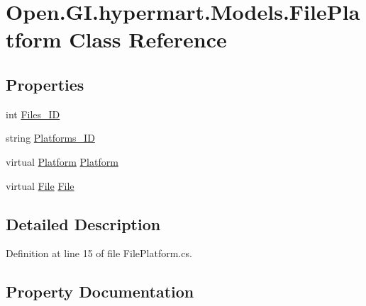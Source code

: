 \hypertarget{class_open_1_1_g_i_1_1hypermart_1_1_models_1_1_file_platform}{}\section{Open.\+G\+I.\+hypermart.\+Models.\+File\+Platform Class Reference}
\label{class_open_1_1_g_i_1_1hypermart_1_1_models_1_1_file_platform}
\subsection*{Properties}
\begin{DoxyCompactItemize}
\item 
int \hyperlink{class_open_1_1_g_i_1_1hypermart_1_1_models_1_1_file_platform_a6a2b6dbace772016d649b3feb7c65e44}{Files\+\_\+\+I\+D}
\item 
string \hyperlink{class_open_1_1_g_i_1_1hypermart_1_1_models_1_1_file_platform_afe9e1d6e156cababf5d2123d21556d5f}{Platforms\+\_\+\+I\+D}
\item 
virtual \hyperlink{class_open_1_1_g_i_1_1hypermart_1_1_models_1_1_platform}{Platform} \hyperlink{class_open_1_1_g_i_1_1hypermart_1_1_models_1_1_file_platform_aeab28cbe72f89ee18f61510d8ea2b7bc}{Platform}
\item 
virtual \hyperlink{class_open_1_1_g_i_1_1hypermart_1_1_models_1_1_file}{File} \hyperlink{class_open_1_1_g_i_1_1hypermart_1_1_models_1_1_file_platform_aa9fd91411ba71f8dd77bdba062daecd3}{File}
\end{DoxyCompactItemize}


\subsection{Detailed Description}


Definition at line 15 of file File\+Platform.\+cs.



\subsection{Property Documentation}
\hypertarget{class_open_1_1_g_i_1_1hypermart_1_1_models_1_1_file_platform_aa9fd91411ba71f8dd77bdba062daecd3}{}
